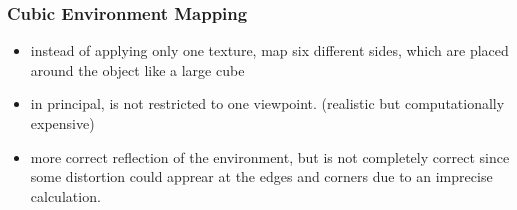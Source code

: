 \documentclass{standalone}
\begin{document}
\subsubsection*{Cubic Environment Mapping}

\begin{itemize}
	\item instead of applying only one texture, map six different sides, which are placed around the object like a large cube
	\item in principal, is not restricted to one viewpoint. (realistic but computationally expensive)
	\item more correct reflection of the environment, but is not completely correct since some distortion could apprear at the edges and corners due to an imprecise calculation. 
\end{itemize}
      
\end{document}

